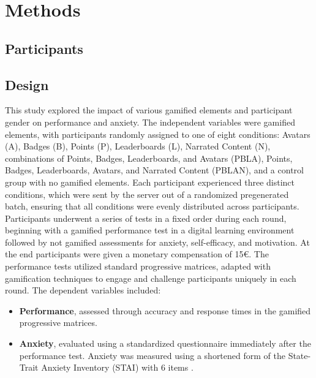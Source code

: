 \section{Methods}
\subsection{Participants}
\subsection{Design}
This study explored the impact of various gamified elements and participant gender on performance and anxiety.
The independent variables were gamified elements, with participants randomly assigned to one of eight conditions: Avatars (A), Badges (B), Points (P), Leaderboards (L), Narrated Content (N), combinations of Points, Badges, Leaderboards, and Avatars (PBLA), Points, Badges, Leaderboards, Avatars, and Narrated Content (PBLAN), and a control group with no gamified elements.
Each participant experienced three distinct conditions, which were sent by the server out of a randomized pregenerated batch, ensuring that all conditions were evenly distributed across participants.
Participants underwent a series of tests in a fixed order during each round, beginning with a gamified performance test in a digital learning environment followed by  not gamified assessments for anxiety, self-efficacy, and motivation.
At the end participants were given a monetary compensation of 15€.
The performance tests utilized standard progressive matrices, adapted with gamification techniques to engage and challenge participants uniquely in each round.
The dependent variables included:
\begin{itemize}
  \item \textbf{Performance}, assessed through accuracy and response times in the gamified progressive matrices.
  \item \textbf{Anxiety}, evaluated using a standardized questionnaire immediately after the performance test. Anxiety was measured using a shortened form of the State-Trait Anxiety Inventory (STAI) with 6 items \parencite{marteauDevelopmentSixitemShortform1992}.
\end{itemize}

